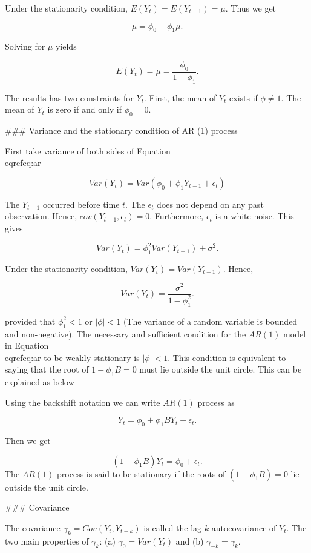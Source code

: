 \documentclass[11pt,a4paper,]{article}
\begin{document}
{Under the stationarity condition, $E(Y_t)=E(Y_{t-1})=\mu$. Thus we get

$$\mu = \phi_0+\phi_1\mu.$$

Solving for $\mu$  yields

\begin{equation}
  \label{eq:2}
E(Y_t)=\mu=\frac{\phi_0}{1-\phi_1}.
\end{equation}


The results has two constraints for $Y_t$. First, the mean of $Y_t$ exists if $\phi \neq 1 .$ The mean of $Y_t$ is zero if and only if $\phi_0=0$.  

### Variance and the stationary condition of AR (1) process

First take variance of both sides of Equation \\eqref{eq:ar}

$$Var(Y_t)=Var(\phi_0+\phi_1 Y_{t-1}+\epsilon_t)$$

The $Y_{t-1}$ occurred before time $t$. The $\epsilon_t$ does not depend on any past observation. Hence, $cov(Y_{t-1}, \epsilon_t)= 0$. Furthermore, ${\epsilon_t}$ is a white noise. This gives

$$Var(Y_t)=\phi_1^2 Var(Y_{t-1})+\sigma^2.$$

Under the stationarity condition, $Var(Y_t)=Var(Y_{t-1})$. Hence,

$$Var(Y_t)=\frac{\sigma^2}{1-\phi_1^2}.$$

provided that $\phi_1^2 < 1$ or $|\phi| < 1$ (The variance of a random variable is bounded and non-negative). The necessary and sufficient condition for the $AR(1)$ model in Equation \\eqref{eq:ar} to be weakly stationary is $|\phi| < 1$. This condition is equivalent to saying that the root of $1-\phi_1B = 0$ must lie outside the unit circle. This can be explained as below

Using the backshift notation we can write $AR(1)$ process as 

$$Y_t = \phi_0 + \phi_1BY_{t} + \epsilon_t.$$

Then we get

$$(1-\phi_1B)Y_t=\phi_0 + \epsilon_t.$$ The $AR(1)$ process is said to be stationary if the roots of $(1-\phi_1B)=0$ lie outside the unit circle. 

### Covariance 

The covariance $\gamma_k=Cov(Y_t, Y_{t-k})$ is called the lag-$k$ autocovariance of $Y_t$. The two main properties of $\gamma_k$: (a) $\gamma_0=Var(Y_t)$ and (b) $\gamma_{-k}=\gamma_{k}$. 

}
\end{document}
